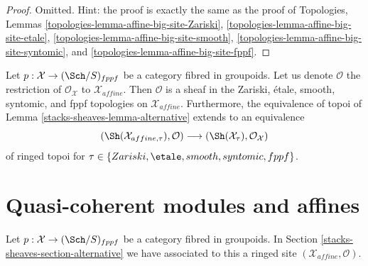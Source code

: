\begin{proof}
Omitted. Hint: the proof is exactly the same as the proof of
Topologies, Lemmas
\ref{topologies-lemma-affine-big-site-Zariski},
\ref{topologies-lemma-affine-big-site-etale},
\ref{topologies-lemma-affine-big-site-smooth},
\ref{topologies-lemma-affine-big-site-syntomic}, and
\ref{topologies-lemma-affine-big-site-fppf}.
\end{proof}

Let $p : \mathcal{X} \to (\Sch/S)_{fppf}$ be a category fibred in groupoids.
Let us denote $\mathcal{O}$ the restriction of $\mathcal{O}_\mathcal{X}$
to $\mathcal{X}_{affine}$. Then $\mathcal{O}$ is a sheaf in the
Zariski, \'etale, smooth, syntomic, and fppf topologies on
$\mathcal{X}_{affine}$. Furthermore, the equivalence of topoi of
Lemma \ref{stacks-sheaves-lemma-alternative} extends to an equivalence
\begin{equation}
\label{equation-alternative-ringed}
(\Sh(\mathcal{X}_{affine, \tau}), \mathcal{O})
\longrightarrow
(\Sh(\mathcal{X}_\tau), \mathcal{O}_\mathcal{X})
\end{equation}
of ringed topoi for $\tau \in \{Zariski, \etale, smooth, syntomic, fppf\}$.

\section{Quasi-coherent modules and affines}
\label{stacks-sheaves-section-alternative-quasi-coherent}
Let $p : \mathcal{X} \to (\Sch/S)_{fppf}$ be a category fibred in groupoids.
In Section \ref{stacks-sheaves-section-alternative} we have associated to this a ringed site
$(\mathcal{X}_{affine}, \mathcal{O})$.

